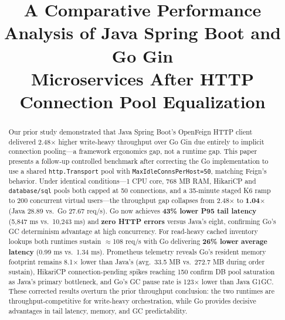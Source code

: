 \documentclass[conference]{IEEEtran}
\begin{document}
\title{A Comparative Performance Analysis of Java Spring Boot and Go Gin\\
Microservices After HTTP Connection Pool Equalization}

\author{
\and
{}
}

\maketitle

\begin{abstract}
Our prior study \cite{b10} demonstrated that Java Spring Boot's OpenFeign HTTP client delivered 2.48$\times$ higher write-heavy throughput over Go Gin due entirely to implicit connection pooling---a framework ergonomics gap, not a runtime gap. This paper presents a follow-up controlled benchmark after correcting the Go implementation to use a shared \texttt{http.Transport} pool with \texttt{MaxIdleConnsPerHost=50}, matching Feign's behavior. Under identical conditions---1 CPU core, 768 MB RAM, HikariCP and \texttt{database/sql} pools both capped at 50 connections, and a 35-minute staged K6 ramp to 200 concurrent virtual users---the throughput gap collapses from 2.48$\times$ to \textbf{1.04$\times$} (Java 28.89 vs.\ Go 27.67 req/s). Go now achieves \textbf{43\% lower P95 tail latency} (5,847 ms vs.\ 10,243 ms) and \textbf{zero HTTP errors} versus Java's eight, confirming Go's GC determinism advantage at high concurrency. For read-heavy cached inventory lookups both runtimes sustain $\approx$108 req/s with Go delivering \textbf{26\% lower average latency} (0.99 ms vs.\ 1.34 ms). Prometheus telemetry reveals Go's resident memory footprint remains 8.1$\times$ lower than Java's (avg.\ 33.5 MB vs.\ 272.7 MB during order sustain), HikariCP connection-pending spikes reaching 150 confirm DB pool saturation as Java's primary bottleneck, and Go's GC pause rate is 123$\times$ lower than Java G1GC. These corrected results overturn the prior throughput conclusion: the two runtimes are throughput-competitive for write-heavy orchestration, while Go provides decisive advantages in tail latency, memory, and GC predictability.
\end{abstract}
\end{document}
